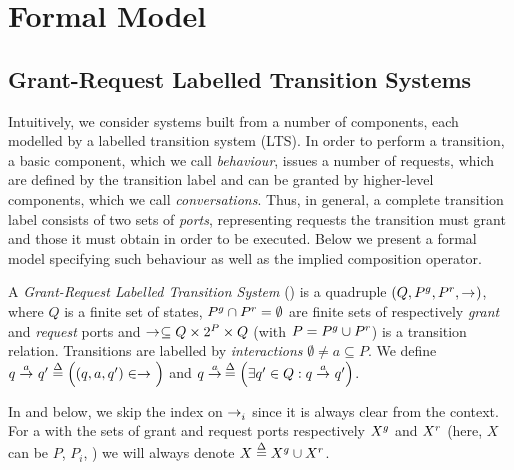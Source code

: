 
\section{Formal Model}
\label{sec:formal}


\subsection{Grant-Request Labelled Transition Systems}
\label{sec:model}

Intuitively, we consider systems built from a number of components, each
modelled by a labelled transition system (LTS).  In order to perform a
transition, a basic component, which we call {\em behaviour}, issues a
number of requests, which are defined by the transition label and can be
granted by higher-level components, which we call {\em conversations}.
Thus, in general, a complete transition label consists of two sets of {\em
  ports}, representing requests the transition must grant and those it must
obtain in order to be executed.  Below we present a formal model specifying
such behaviour as well as the implied composition operator.

\begin{definition}
\label{defn:lts}
A \emph{Grant-Request Labelled Transition System} (\compmodel{}) is a
quadruple $(Q,\pin,\pout,\goesto[])$, where $Q$ is a finite set of states,
$\pin \cap \pout = \emptyset$ are finite sets of respectively {\em grant}
and {\em request} ports and $\goesto[] \subseteq Q \times 2^P \times Q$
(with $P = \pin \cup \pout$) is a transition relation.  Transitions are
labelled by \emph{interactions} $\emptyset \neq a \subseteq P$.  We define
$q \goesto[a] q' \bydef{=}\Big((q, a, q') \in \goesto[]\Big)$ and $q
\goesto[a]\, \bydef{=}\Big(\exists q' \in Q: q \goesto[a] q'\Big)$.
\end{definition}

\begin{notation}
  \label{ntn:lts}
  In  and below, we skip the index on $\goesto_i$ since it is
  always clear from the context.  For a \compmodel{} with the sets of grant
  and request ports respectively $\grant{X}$ and $\request{X}$ (here, $X$
  can be $P$, $P_i$, \etc[]) we will always denote $X \bydef{=} \grant{X}
  \cup \request{X}$.
\end{notation}

